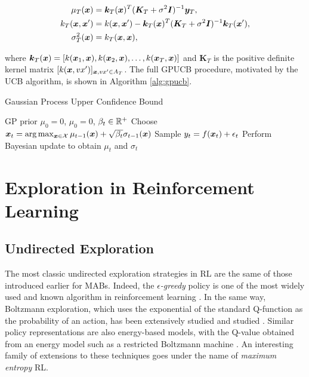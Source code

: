 \begin{align}
\mu_T(\boldsymbol{x}) &= \boldsymbol{k}_T(\boldsymbol{x})^T(\boldsymbol{K}_T+\sigma^2\boldsymbol{I})^{-1}\boldsymbol{y}_T, \\
k_T(\boldsymbol{x},\boldsymbol{x}') &= k(\boldsymbol{x},\boldsymbol{x}')-\boldsymbol{k}_T(\boldsymbol{x})^T(\boldsymbol{K}_T+\sigma^2\boldsymbol{I})^{-1}\boldsymbol{k}_T(\boldsymbol{x}'),\\
\sigma^2_T(\boldsymbol{x}) &= k_T(\boldsymbol{x},\boldsymbol{x}),\\
\end{align}

where $\boldsymbol{k}_T(\boldsymbol{x}) = [k(\boldsymbol{x}_1,\boldsymbol{x}),k(\boldsymbol{x}_2,\boldsymbol{x}),\dots,k(\boldsymbol{x}_T,\boldsymbol{x})]$ and $\boldsymbol{K}_T$ is the positive definite kernel matrix $[k(\boldsymbol{x},vx')]_{\boldsymbol{x},vx'\in A_T}$.
The full \gls{GPUCB} procedure, motivated by the \gls{UCB} algorithm, is shown in Algorithm \ref{alg:gpucb}.

\begin{algorithm}[t]
	\caption{Gaussian Process Upper Confidence Bound}
	\label{alg:gpucb}
	\begin{algorithmic}[1]
	 GP prior $\mu_0=0$, $\mu_0=0$, $\beta_t\in\mathbb{R}^+$
		\State Choose $\boldsymbol{x}_t = \arg\max_{\boldsymbol{x}\in\mathcal{X}}\mu_{t-1}(\boldsymbol{x})+\sqrt{\beta_t}\sigma_{t-1}(\boldsymbol{x})$
		\State Sample $y_t = f(\boldsymbol{x}_t)+\epsilon_t$
		\State Perform Bayesian update to obtain $\mu_t$ and $\sigma_t$
	\EndFor
	\end{algorithmic}
\end{algorithm}

\section{Exploration in Reinforcement Learning}

\subsection{Undirected Exploration}
The most classic undirected exploration strategies in \gls{RL} are the same of those introduced earlier for \gls{MAB}s. Indeed, the $\epsilon$\emph{-greedy} policy is one of the most widely used and known algorithm in reinforcement learning \cite{sutton2018reinforcement}. In the same way, Boltzmann exploration, which uses the exponential of the
standard Q-function as the probability of an action, has been extensively studied and studied \cite{thrun1992efficient, cesa2017boltzmann}. Similar policy representations are also energy-based models, with
the Q-value obtained from an energy model such as a restricted Boltzmann machine \cite{sallans2004reinforcement}. An interesting family of extensions to these techniques goes under the name of \emph{maximum entropy} \gls{RL}.

